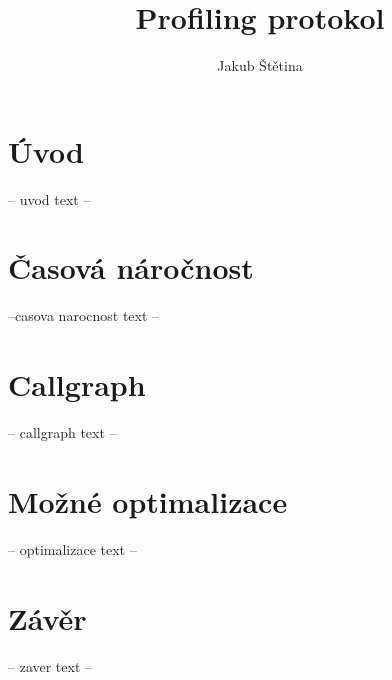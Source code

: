 \documentclass{article}
\begin{document}
    \title{Profiling protokol}
    \author{Jakub Štětina}

    \section{Úvod}
    -- uvod text --

    \section{Časová náročnost}
    --casova narocnost text --

    \section{Callgraph}
    -- callgraph text --

    \section{Možné optimalizace}
     -- optimalizace text --
  
    \section{Závěr}
    -- zaver text --
\end{document}

